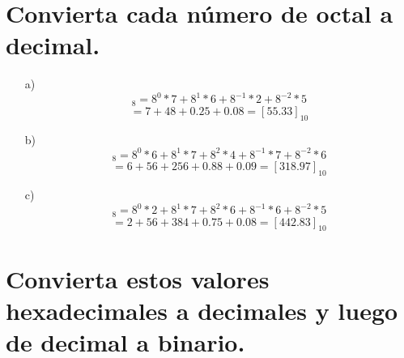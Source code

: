 \documentclass{article}
\begin{document}
\section{Convierta cada número de octal a decimal.}
\begin{enumerate}
    \item[a)] \begin{equation*} [67.25]_{8} = 8^{0} * 7 + 8^{1} * 6 + 8^{-1} * 2 + 8^{-2} * 5\end{equation*} \begin{equation*} = 7 + 48 + 0.25 + 0.08 = [55.33]_{10}\end{equation*}
    \item[b)] \begin{equation*} [476.76]_{8} = 8^{0} * 6 + 8^{1} * 7 + 8^{2} * 4 + 8^{-1} * 7 + 8^{-2} * 6\end{equation*} \begin{equation*} = 6 + 56 + 256 + 0.88 + 0.09 = [318.97]_{10}\end{equation*}
    \item[c)] \begin{equation*} [672.65]_{8} = 8^{0} * 2 + 8^{1} * 7 + 8^{2} * 6 + 8^{-1} * 6 + 8^{-2} * 5\end{equation*} \begin{equation*} = 2 + 56 + 384 + 0.75 + 0.08 = [442.83]_{10}\end{equation*}
\end{enumerate}

\section{Convierta estos valores hexadecimales a decimales y luego de decimal a binario.}
\end{document}
